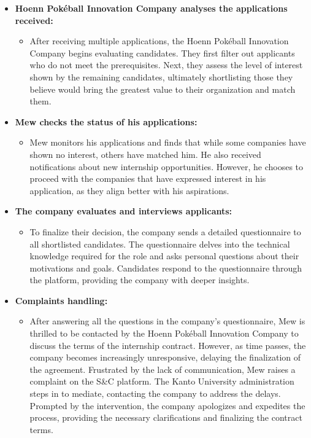 \begin{itemize}[leftmargin=*, label={}]
    \item \textbf{Hoenn Pokéball Innovation Company analyses the applications received:}
    \begin{itemize}
        \item After receiving multiple applications, the Hoenn Pokéball Innovation Company begins evaluating candidates. They first filter out applicants who do not meet the prerequisites. Next, they assess the level of interest shown by the remaining candidates, ultimately shortlisting those they believe would bring the greatest value to their organization and match them.
    \end{itemize}

    \item \textbf{Mew checks the status of his applications:}
    \begin{itemize}
        \item Mew monitors his applications and finds that while some companies have shown no interest, others have matched him. He also received notifications about new internship opportunities. However, he chooses to proceed with the companies that have expressed interest in his application, as they align better with his aspirations.
    \end{itemize}

    \item \textbf{The company evaluates and interviews applicants:}
    \begin{itemize}
        \item To finalize their decision, the company sends a detailed questionnaire to all shortlisted candidates. The questionnaire delves into the technical knowledge required for the role and asks personal questions about their motivations and goals. Candidates respond to the questionnaire through the platform, providing the company with deeper insights.
    \end{itemize}

    \item \textbf{Complaints handling:}
    \begin{itemize}
        \item After answering all the questions in the company’s questionnaire, Mew is thrilled to be contacted by the Hoenn Pokéball Innovation Company to discuss the terms of the internship contract. However, as time passes, the company becomes increasingly unresponsive, delaying the finalization of the agreement. Frustrated by the lack of communication, Mew raises a complaint on the S\&C platform. The Kanto University administration steps in to mediate, contacting the company to address the delays. Prompted by the intervention, the company apologizes and expedites the process, providing the necessary clarifications and finalizing the contract terms.
    \end{itemize}


\end{itemize}
